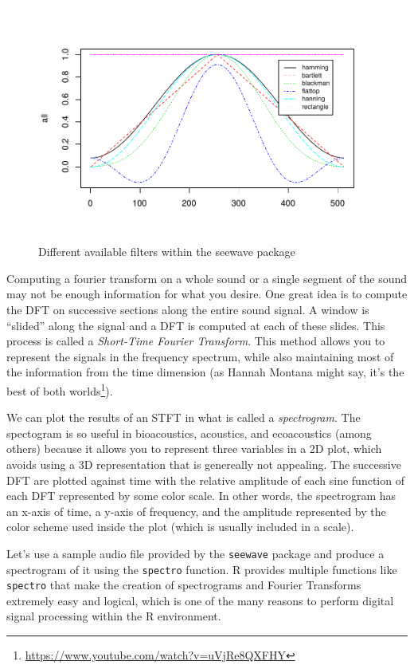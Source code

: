 \documentclass[
]{krantz}
\renewcommand{\href}[2]{#2\footnote{\url{#1}}}
\begin{document}
\begin{figure}
\centering
\includegraphics{bookdown_files/figure-latex/filters-1.pdf}
\caption{\label{fig:filters}Different available filters within the seewave package}
\end{figure}

Computing a fourier transform on a whole sound or a single segment of the sound may not be enough information for what you desire. One great idea is to compute the DFT on successive sections along the entire sound signal. A window is ``slided'' along the signal and a DFT is computed at each of these slides. This process is called a \emph{Short-Time Fourier Transform}. This method allows you to represent the signals in the frequency spectrum, while also maintaining most of the information from the time dimension (as Hannah Montana might say, it's the \href{https://www.youtube.com/watch?v=uVjRe8QXFHY}{best of both worlds}).

We can plot the results of an STFT in what is called a \emph{spectrogram}. The spectogram is so useful in bioacoustics, acoustics, and ecoacoustics (among others) because it allows you to represent three variables in a 2D plot, which avoids using a 3D representation that is genereally not appealing. The successive DFT are plotted against time with the relative amplitude of each sine function of each DFT represented by some color scale. In other words, the spectrogram has an x-axis of time, a y-axis of frequency, and the amplitude represented by the color scheme used inside the plot (which is usually included in a scale).

Let's use a sample audio file provided by the \texttt{seewave} package and produce a spectrogram of it using the \texttt{spectro} function. R provides multiple functions like \texttt{spectro} that make the creation of spectrograms and Fourier Transforms extremely easy and logical, which is one of the many reasons to perform digital signal processing within the R environment.
\end{document}
